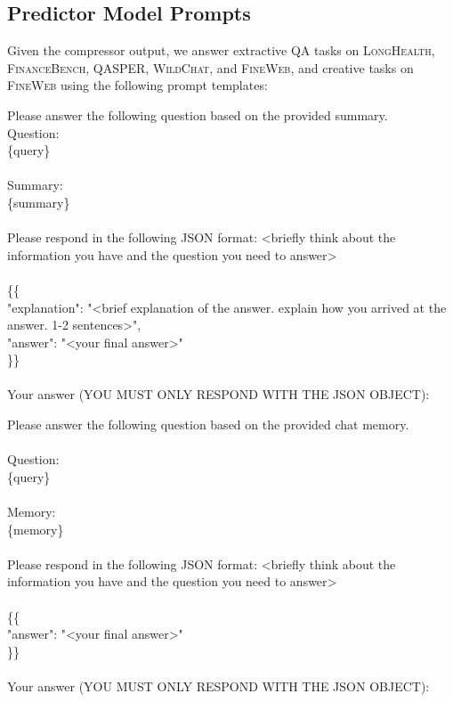 \documentclass{article} %
\newcommand{\tab}{\hspace*{2em}}
\begin{document}
\subsection{Predictor Model Prompts}
\label{sec:appendix-prompts-prediction}
Given the compressor output, we answer extractive QA tasks on \textsc{LongHealth}, \textsc{FinanceBench}, \textsc{QASPER}, \textsc{WildChat}, and \textsc{FineWeb}, and creative tasks on \textsc{FineWeb} using the following prompt templates:

\begin{examplebox}
    \ttfamily
Please answer the following question based on the provided summary.\\
Question:\\
\{query\}\\
\\
Summary:\\
\{summary\}\\
\\
Please respond in the following JSON format:
<briefly think about the information you have and the question you need to answer>\\
\\
\{\{ \\
\tab "explanation": "<brief explanation of the answer. explain how you arrived at the answer. 1-2 sentences>", \\
\tab "answer": "<your final answer>" \\
\}\}\\
\\
Your answer (YOU MUST ONLY RESPOND WITH THE JSON OBJECT):
\end{examplebox}

\begin{examplebox}
    \ttfamily
Please answer the following question based on the provided chat memory.\\
\\
Question:\\
\{query\}\\
\\
Memory:\\
\{memory\}\\
\\
Please respond in the following JSON format:
<briefly think about the information you have and the question you need to answer>\\
\\
\{\{\\
\tab "answer": "<your final answer>" \\
\}\}\\
\\
Your answer (YOU MUST ONLY RESPOND WITH THE JSON OBJECT):
\end{examplebox}
\end{document}
